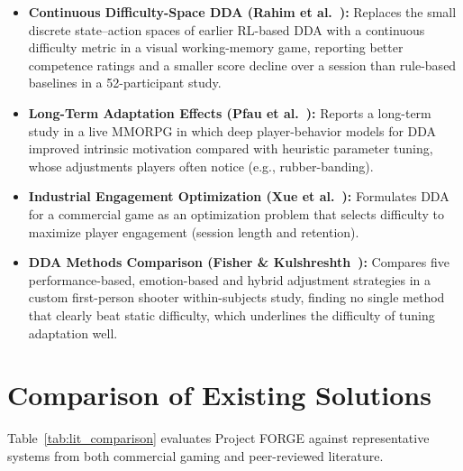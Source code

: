 \begin{itemize}
    \item \textbf{Continuous Difficulty-Space DDA (Rahim et al.~\cite{rahim2023continuous}):} Replaces the small discrete state--action spaces of earlier RL-based DDA with a continuous difficulty metric in a visual working-memory game, reporting better competence ratings and a smaller score decline over a session than rule-based baselines in a 52-participant study.
    \item \textbf{Long-Term Adaptation Effects (Pfau et al.~\cite{pfau2020enemy}):} Reports a long-term study in a live MMORPG in which deep player-behavior models for DDA improved intrinsic motivation compared with heuristic parameter tuning, whose adjustments players often notice (e.g., rubber-banding).
    \item \textbf{Industrial Engagement Optimization (Xue et al.~\cite{xue2017dynamic}):} Formulates DDA for a commercial game as an optimization problem that selects difficulty to maximize player engagement (session length and retention).
    \item \textbf{DDA Methods Comparison (Fisher \& Kulshreshth~\cite{fisher2024exploring}):} Compares five performance-based, emotion-based and hybrid adjustment strategies in a custom first-person shooter within-subjects study, finding no single method that clearly beat static difficulty, which underlines the difficulty of tuning adaptation well.
\end{itemize}

\section{Comparison of Existing Solutions}
Table~\ref{tab:lit_comparison} evaluates Project FORGE against representative systems from both commercial gaming and peer-reviewed literature.

